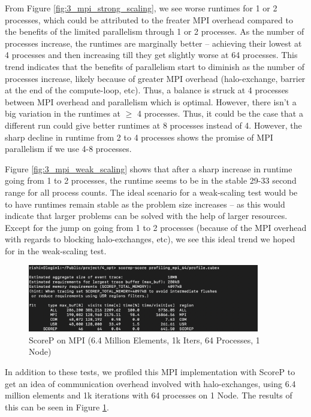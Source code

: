 \documentclass[a4paper,10pt]{article}
\begin{document}
From Figure \ref{fig:3_mpi_strong_scaling}, we see worse runtimes for 1 or 2 processes, which could be attributed to the freater MPI overhead compared to the benefits of the limited parallelism through 1 or 2 processes. As the number of processes increase, the runtimes are marginally better -- achieving their lowest at 4 processes and then increasing till they get slightly worse at 64 processes. This trend indicates that the benefits of parallelism start to diminish as the number of processes increase, likely because of greater MPI overhead (halo-exchange, barrier at the end of the compute-loop, etc). Thus, a balance is struck at 4 processes between MPI overhead and parallelism which is optimal. However, there isn't a big variation in the runtimes at $\geq$ 4 processes. Thus, it could be the case that a different run could give better runtimes at 8 processes instead of 4. However, the sharp decline in runtime from 2 to 4 processes shows the promise of MPI parallelism if we use 4-8 processes. 

Figure \ref{fig:3_mpi_weak_scaling} shows that after a sharp increase in runtime going from 1 to 2 processes, the runtime seems to be in the stable 29-33 second range for all process counts. The ideal scenario for a weak-scaling test would be to have runtimes remain stable as the problem size increases -- as this would indicate that larger problems can be solved with the help of larger resources. Except for the jump on going from 1 to 2 processes (because of the MPI overhead with regards to blocking halo-exchanges, etc), we see this ideal trend we hoped for in the weak-scaling test. 

\begin{figure}[H]
  \centering
  \includegraphics[width=0.9\textwidth]{../images/4_opt/scorep_64_mpi.png}
  \caption{ScoreP on MPI (6.4 Million Elements, 1k Iters, 64 Processes, 1 Node)}
  \label{fig:3_mpi_scorep_64}
\end{figure}

In addition to these tests, we profiled this MPI implementation with ScoreP to get an idea of communication overhead involved with halo-exchanges, using 6.4 million elements and 1k iterations with 64 processes on 1 Node. The results of this can be seen in Figure \ref{fig:3_mpi_scorep_64}. 
\end{document}
